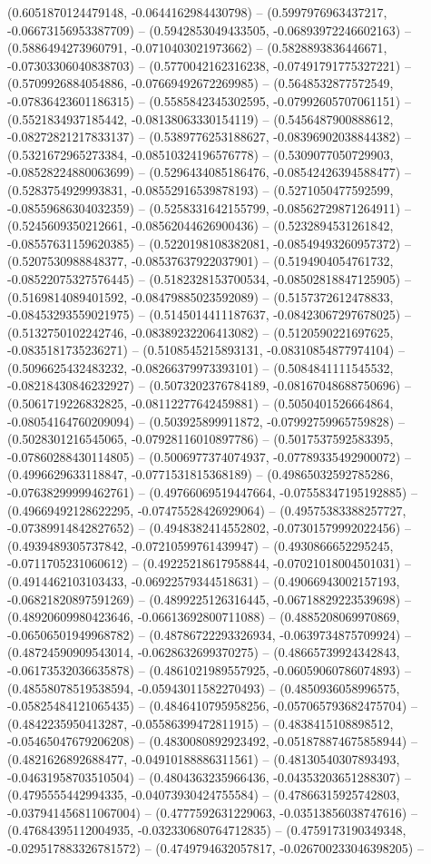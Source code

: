 (0.6051870124479148, -0.0644162984430798) -- (0.5997976963437217, -0.06673156953387709) -- (0.5942853049433505, -0.06893972246602163) -- (0.5886494273960791, -0.0710403021973662) -- (0.5828893836446671, -0.07303306040838703) -- (0.5770042162316238, -0.07491791775327221) -- (0.5709926884054886, -0.07669492672269985) -- (0.5648532877572549, -0.07836423601186315) -- (0.5585842345302595, -0.07992605707061151) -- (0.5521834937185442, -0.08138063330154119) -- (0.5456487900888612, -0.08272821217833137) -- (0.5389776253188627, -0.08396902038844382) -- (0.5321672965273384, -0.08510324196576778) -- (0.5309077050729903, -0.08528224880063699) -- (0.5296434085186476, -0.08542426394588477) -- (0.5283754929993831, -0.08552916539878193) -- (0.5271050477592599, -0.08559686304032359) -- (0.5258331642155799, -0.08562729871264911) -- (0.5245609350212661, -0.08562044626900436) -- (0.5232894531261842, -0.08557631159620385) -- (0.5220198108382081, -0.08549493260957372) -- (0.5207530988848377, -0.08537637922037901) -- (0.5194904054761732, -0.08522075327576445) -- (0.5182328153700534, -0.08502818847125905) -- (0.5169814089401592, -0.08479885023592089) -- (0.5157372612478833, -0.08453293559021975) -- (0.5145014411187637, -0.08423067297678025) -- (0.5132750102242746, -0.08389232206413082) -- (0.5120590221697625, -0.0835181735236271) -- (0.5108545215893131, -0.08310854877974104) -- (0.5096625432483232, -0.08266379973393101) -- (0.5084841111545532, -0.08218430846232927) -- (0.5073202376784189, -0.08167048688750696) -- (0.5061719226832825, -0.08112277642459881) -- (0.5050401526664864, -0.08054164760209094) -- (0.503925899911872, -0.07992759965759828) -- (0.5028301216545065, -0.07928116010897786) -- (0.5017537592583395, -0.07860288430114805) -- (0.5006977374074937, -0.07789335492900072) -- (0.4996629633118847, -0.0771531815368189) -- (0.49865032592785286, -0.07638299999462761) -- (0.49766069519447664, -0.07558347195192885) -- (0.49669492128622295, -0.07475528426929064) -- (0.49575383388257727, -0.07389914842827652) -- (0.4948382414552802, -0.07301579992022456) -- (0.4939489305737842, -0.07210599761439947) -- (0.4930866652295245, -0.0711705231060612) -- (0.49225218617958844, -0.07021018004501031) -- (0.4914462103103433, -0.06922579344518631) -- (0.49066943002157193, -0.06821820897591269) -- (0.4899225126316445, -0.06718829223539698) -- (0.48920609980423646, -0.06613692800711088) -- (0.4885208069970869, -0.06506501949968782) -- (0.48786722293326934, -0.0639734875709924) -- (0.48724590909543014, -0.0628632699370275) -- (0.48665739924342843, -0.06173532036635878) -- (0.4861021989557925, -0.06059060786074893) -- (0.48558078519538594, -0.05943011582270493) -- (0.4850936058996575, -0.05825484121065435) -- (0.4846410795958256, -0.057065793682475704) -- (0.4842235950413287, -0.05586399472811915) -- (0.4838415108898512, -0.05465047679206208) -- (0.4830080892923492, -0.051878874675858944) -- (0.4821626892688477, -0.04910188886311561) -- (0.48130540307893493, -0.04631958703510504) -- (0.4804363235966436, -0.04353203651288307) -- (0.4795555442994335, -0.04073930424755584) -- (0.47866315925742803, -0.037941456811067004) -- (0.4777592631229063, -0.03513856038747616) -- (0.47684395112004935, -0.032330680764712835) -- (0.4759173190349348, -0.029517883326781572) -- (0.4749794632057817, -0.026700233046398205) -- 